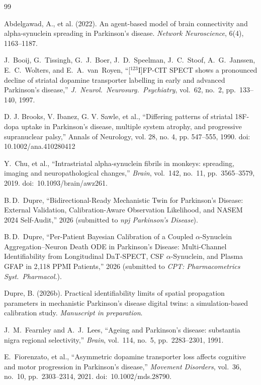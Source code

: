 \begin{thebibliography}{99}

Abdelgawad, A., et al. (2022).
\newblock An agent-based model of brain connectivity and alpha-synuclein spreading in Parkinson's disease.
\newblock \emph{Network Neuroscience}, 6(4), 1163--1187.

J.~Booij, G.~Tissingh, G.~J.~Boer, J.~D.~Speelman, J.~C.~Stoof, A.~G.~Janssen, E.~C.~Wolters, and E.~A.~van~Royen, ``[$^{123}$I]FP-CIT SPECT shows a pronounced decline of striatal dopamine transporter labelling in early and advanced Parkinson's disease,'' \textit{J.\ Neurol.\ Neurosurg.\ Psychiatry}, vol.~62, no.~2, pp.~133--140, 1997.

 D. J. Brooks, V. Ibanez, G. V. Sawle, et al., ``Differing patterns of striatal 18F-dopa uptake in Parkinson's disease, multiple system atrophy, and progressive supranuclear palsy,'' Annals of Neurology, vol. 28, no. 4, pp. 547--555, 1990. doi: 10.1002/ana.410280412

Y.~Chu, et al., ``Intrastriatal alpha-synuclein fibrils in monkeys: spreading, imaging and neuropathological changes,'' \textit{Brain}, vol.~142, no.~11, pp.~3565--3579, 2019. doi:~10.1093/brain/awz261.

 B.\,D.~Dupre, ``Bidirectional-Ready Mechanistic Twin for Parkinson's Disease: External Validation, Calibration-Aware Observation Likelihood, and NASEM 2024 Self-Audit,'' 2026 (submitted to \textit{npj Parkinson's Disease}).

 B.\,D.~Dupre, ``Per-Patient Bayesian Calibration of a Coupled $\alpha$-Synuclein Aggregation--Neuron Death ODE in Parkinson's Disease: Multi-Channel Identifiability from Longitudinal DaT-SPECT, CSF $\alpha$-Synuclein, and Plasma GFAP in 2{,}118 PPMI Patients,'' 2026 (submitted to \textit{CPT: Pharmacometrics Syst.\ Pharmacol.}).

Dupre, B. (2026b).
\newblock Practical identifiability limits of spatial propagation parameters in mechanistic Parkinson's disease digital twins: a simulation-based calibration study.
\newblock \emph{Manuscript in preparation}.

J.~M.~Fearnley and A.~J.~Lees, ``Ageing and Parkinson's disease: substantia nigra regional selectivity,'' \textit{Brain}, vol.~114, no.~5, pp.~2283--2301, 1991.

E.~Fiorenzato, et al., ``Asymmetric dopamine transporter loss affects cognitive and motor progression in Parkinson's disease,'' \textit{Movement Disorders}, vol.~36, no.~10, pp.~2303--2314, 2021. doi:~10.1002/mds.28790.


\end{thebibliography}
